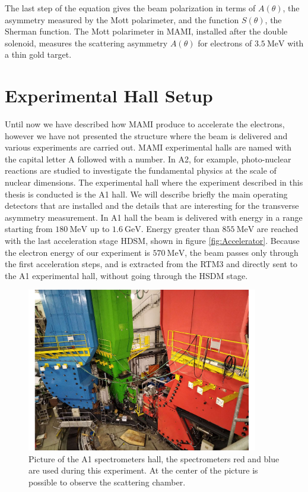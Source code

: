 The last step of the equation gives the beam polarization in terms of $A(\theta)$, the asymmetry measured by the Mott polarimeter, and the function $S(\theta)$, the Sherman function. The Mott polarimeter in MAMI, installed after the double solenoid, measures the scattering asymmetry $A(\theta)$ for electrons of $\SI{3.5}{\mega \electronvolt}$ with a thin gold target.  

\newpage
\section{Experimental Hall Setup} \label{ExperimentalHall}

Until now we have described how MAMI produce to accelerate the electrons, however we have not presented the structure where the beam is delivered and various experiments are carried out.
MAMI experimental halls are named with the capital letter A followed with a number. In A2, for example, photo-nuclear reactions are studied to investigate the fundamental physics at the scale of nuclear dimensions. The experimental hall where the experiment described in this thesis is conducted is the A1 hall. We will describe briefly the main operating detectors that are installed and the details that are interesting for the transverse asymmetry measurement.
In A1 hall the beam is delivered with energy in a range starting from $\SI{180}{\mega \electronvolt}$ up to $\SI{1.6}{\giga \electronvolt}$. Energy greater than $\SI{855}{\mega \electronvolt}$ are reached with the last acceleration stage HDSM, shown in figure \ref{fig:Accelerator}. Because the electron energy of our experiment is $\SI{570}{\mega \electronvolt}$, the beam passes only through the first acceleration steps, and is extracted from the RTM3 and directly sent to the A1 experimental hall, without going through the HSDM stage. 

\begin{figure}[!h]
\centering
\includegraphics[width = 0.9\textwidth]{figures/twoSpektrometer.pdf}
\caption{Picture of the A1 spectrometers hall, the spectrometers red and blue are used during this experiment. At the center of the picture is possible to observe the scattering chamber.}
\label{fig:TwoSpektr}
\end{figure}

